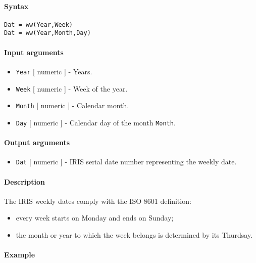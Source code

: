 


	\paragraph{Syntax}

\begin{verbatim}
Dat = ww(Year,Week)
Dat = ww(Year,Month,Day)
\end{verbatim}

\paragraph{Input arguments}

\begin{itemize}
\item
  \texttt{Year} {[} numeric {]} - Years.
\item
  \texttt{Week} {[} numeric {]} - Week of the year.
\item
  \texttt{Month} {[} numeric {]} - Calendar month.
\item
  \texttt{Day} {[} numeric {]} - Calendar day of the month
  \texttt{Month}.
\end{itemize}

\paragraph{Output arguments}

\begin{itemize}
\itemsep1pt\parskip0pt
\item
  \texttt{Dat} {[} numeric {]} - IRIS serial date number representing
  the weekly date.
\end{itemize}

\paragraph{Description}

The IRIS weekly dates comply with the ISO 8601 definition:

\begin{itemize}
\item
  every week starts on Monday and ends on Sunday;
\item
  the month or year to which the week belongs is determined by its
  Thurdsay.
\end{itemize}

\paragraph{Example}


